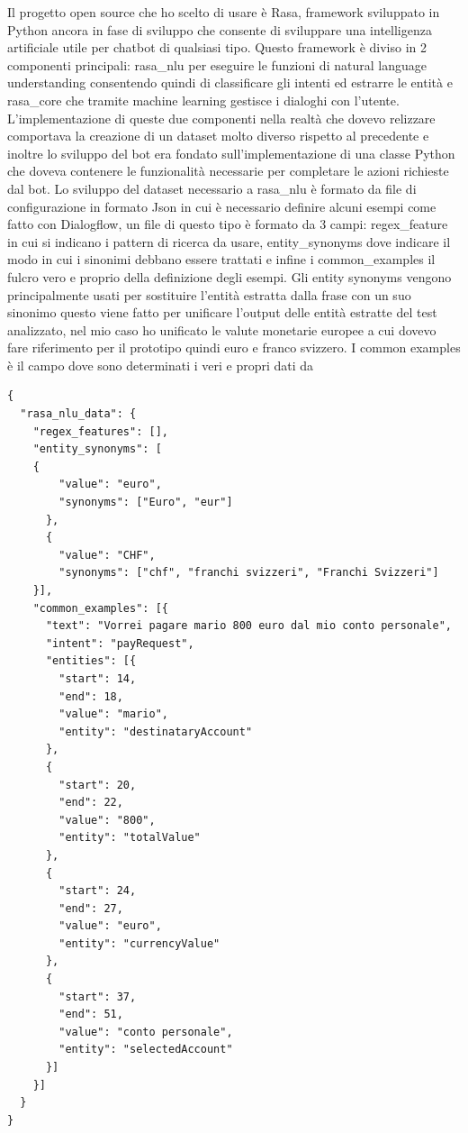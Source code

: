 Il progetto open source che ho scelto di usare è Rasa, framework sviluppato in Python ancora in fase di sviluppo che consente di sviluppare una intelligenza artificiale utile per chatbot di qualsiasi tipo.
Questo framework è diviso in 2 componenti principali: rasa\_nlu per eseguire le funzioni di natural language understanding consentendo quindi di classificare gli intenti ed estrarre le entità e rasa\_core che tramite machine learning gestisce i dialoghi con l'utente.
L'implementazione di queste due componenti nella realtà che dovevo relizzare comportava la creazione di un dataset molto diverso rispetto al precedente e inoltre lo sviluppo del bot era fondato sull'implementazione di una classe Python che doveva contenere le funzionalità necessarie per completare le azioni richieste dal bot.
Lo sviluppo del dataset necessario a rasa\_nlu è formato da file di configurazione in formato Json in cui è necessario definire alcuni esempi come fatto con Dialogflow, un file di questo tipo è formato da 3 campi: regex\_feature in cui si indicano i pattern di ricerca da usare, entity\_synonyms dove indicare il modo in cui i sinonimi debbano essere trattati e infine i common\_examples il fulcro vero e proprio della definizione degli esempi.
Gli entity synonyms vengono principalmente usati per sostituire l'entità estratta dalla frase con un suo sinonimo questo viene fatto per unificare l'output delle entità estratte del test analizzato, nel mio caso ho unificato le valute monetarie europee a cui dovevo fare riferimento per il prototipo quindi euro e franco svizzero.
I common examples è il campo dove sono determinati i veri e propri dati da 
\begin{lstlisting}
{
  "rasa_nlu_data": {
    "regex_features": [],
    "entity_synonyms": [
    {
        "value": "euro",
        "synonyms": ["Euro", "eur"]
      },
      {
        "value": "CHF",
        "synonyms": ["chf", "franchi svizzeri", "Franchi Svizzeri"]
    }],
    "common_examples": [{
      "text": "Vorrei pagare mario 800 euro dal mio conto personale",
      "intent": "payRequest",
      "entities": [{
        "start": 14,
        "end": 18,
        "value": "mario",
        "entity": "destinataryAccount"
      },
      {
        "start": 20,
        "end": 22,
        "value": "800",
        "entity": "totalValue"
      },
      {
        "start": 24,
        "end": 27,
        "value": "euro",
        "entity": "currencyValue"
      },
      {
        "start": 37,
        "end": 51,
        "value": "conto personale",
        "entity": "selectedAccount"
      }]
    }]
  }
}

\end{lstlisting}
